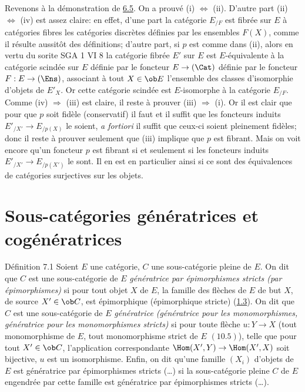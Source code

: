 Revenons à la démonstration de \hyperref[I.prop6.5]{6.5}. On a prouvé (i)
$\Leftrightarrow$ (ii). D'autre part (ii) %
$\Leftrightarrow$ (iv) est assez claire: en effet, d'une part la
catégorie $E_{/F}$ est fibrée sur $E$ à catégories fibres les
catégories discrètes définies par les ensembles $F(X)$, comme il
résulte aussitôt des définitions; d'autre part, si $p$ est comme
dans (ii), alors en vertu du sorite SGA 1 VI 8 la catégorie fibrée
$E'$ sur $E$ est $E$-équivalente à la catégorie scindée sur $E$
définie par le foncteur $E\rightarrow (\Cat)$ définie par le
foncteur $F:E\rightarrow (\Ens)$, associant à tout $X\in \ob E$
l'ensemble des classes d'isomorphie d'objets de $E'_X$. Or cette
catégorie scindée est $E$-isomorphe à la catégorie $E_{/F}$. Comme
(iv) $\Rightarrow$ (iii) est claire, il reste à prouver (iii)
$\Rightarrow$ (i). Or il est clair que pour que $p$ soit fidèle
(\resp  conservatif) il faut et il suffit que les foncteurs induits
$E'_{/X'}\rightarrow E_{/p(X)}$ le soient, \textit{a fortiori} il
suffit que ceux-ci soient pleinement fidèles; donc il reste à
prouver seulement que (iii) implique que $p$ est fibrant. Mais on
voit encore qu'un foncteur $p$ est fibrant si et seulement si les
foncteurs induits $E'_{/X'}\rightarrow E_{/p(X')}$ le sont. Il en
est en particulier ainsi si ce sont des équivalences de catégories
surjectives sur les objets.

\section{Sous-catégories génératrices et
  cogénératrices}\pageoriginale

\begin{enonce*}{Définition 7.1}
Soient $E$ une catégorie, $C$ une sous-catégorie pleine de $E$. On
dit que $C$ est une sous-catégorie de $E$ \emph{génératrice par
épimorphismes stricts (\resp  par épimorphismes)} si pour tout objet
$X$ de $E$, la famille des flèches de $E$ de but $X$, de source
$X'\in \ob C$, est épimorphique (\resp  épimorphique stricte)
(\hyperref[I.condef1.3]{1.3}). On dit que $C$ est une sous-catégorie de $E$
\emph{génératrice (\resp  génératrice pour les monomorphismes, \resp
génératrice pour les monomorphismes stricts)} si pour toute flèche
$u:Y\rightarrow X$ (\resp  tout monomorphisme de $E$, \resp  tout
monomorphisme strict de $E$ $(10.5)$), telle que pour tout $X'\in
\ob C$, l'application correspondante $\Hom(X',Y)\rightarrow
\Hom(X',X)$ soit bijective, $u$ est un isomorphisme. Enfin, on dit
qu'une famille $(X_i)$ d'objets de $E$ est génératrice par
épimorphismes stricts (\resp \ldots) si la sous-catégorie pleine $C$
de $E$ engendrée par cette famille est génératrice par épimorphismes
stricts (\resp \ldots).
\end{enonce*}

